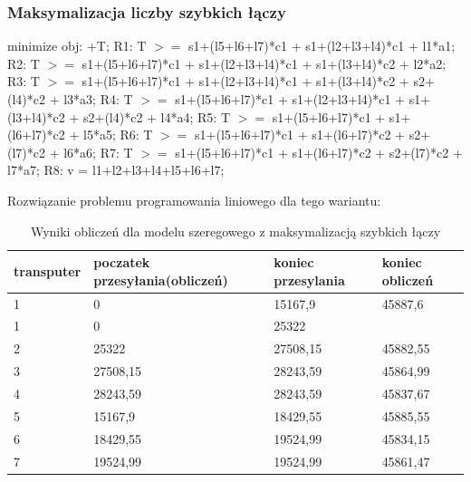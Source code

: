 \documentclass[a4paper,11pt, titlepage]{article}
\begin{document}
\subsubsection{Maksymalizacja liczby szybkich łączy}
\begin{flushleft}

minimize obj: +T;\linebreak
\linebreak
R1: T $>=$ s1+(l5+l6+l7)*c1 + s1+(l2+l3+l4)*c1 + l1*a1;\linebreak
R2: T $>=$ s1+(l5+l6+l7)*c1 + s1+(l2+l3+l4)*c1 + s1+(l3+l4)*c2 + l2*a2;\linebreak
R3: T $>=$ s1+(l5+l6+l7)*c1 + s1+(l2+l3+l4)*c1 + s1+(l3+l4)*c2 + s2+(l4)*c2 + l3*a3;\linebreak
R4: T $>=$ s1+(l5+l6+l7)*c1 + s1+(l2+l3+l4)*c1 + s1+(l3+l4)*c2 + s2+(l4)*c2 + l4*a4;\linebreak
R5: T $>=$ s1+(l5+l6+l7)*c1 + s1+(l6+l7)*c2 + l5*a5;\linebreak
R6: T $>=$ s1+(l5+l6+l7)*c1 + s1+(l6+l7)*c2 + s2+(l7)*c2 + l6*a6;\linebreak
R7: T $>=$ s1+(l5+l6+l7)*c1 + s1+(l6+l7)*c2 + s2+(l7)*c2 + l7*a7;\linebreak
R8: v = l1+l2+l3+l4+l5+l6+l7;\linebreak
\end{flushleft}

Rozwiązanie problemu programowania liniowego dla tego wariantu:
\begin{table}[h!]
\begin{tabular}{|l|l|l|l|}\hline
transputer & poczatek przesyłania(obliczeń) & koniec przesylania & koniec obliczeń\\ \hline
1	&0			&15167,9	&45887,6\\ \hline
1	&0			&25322		&\\ \hline	
2	&25322		&27508,15	&45882,55\\ \hline
3	&27508,15	&28243,59	&45864,99\\ \hline
4	&28243,59	&28243,59	&45837,67\\ \hline
5	&15167,9	&18429,55	&45885,55\\ \hline
6	&18429,55	&19524,99	&45834,15\\ \hline
7	&19524,99	&19524,99	&45861,47\\ \hline
\end{tabular}
\caption{Wyniki obliczeń dla modelu szeregowego z maksymalizacją szybkich łączy \label{szeregowe_lt}}
\end{table}
\end{document}

